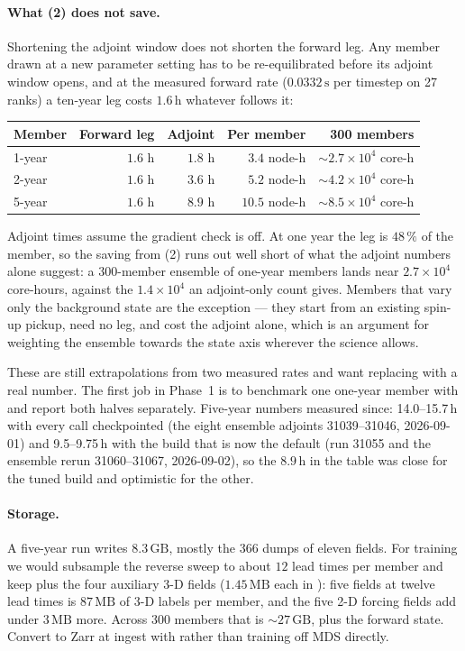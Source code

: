\paragraph{What (2) does not save.}
Shortening the adjoint window does not shorten the forward leg. Any member drawn
at a new parameter setting has to be re-equilibrated before its adjoint window
opens, and at the measured forward rate ($0.0332\,\mathrm{s}$ per timestep on 27
ranks) a ten-year leg costs $1.6\,\mathrm{h}$ whatever follows it:

\begin{center}
\begin{tabular}{lrrrr}
\toprule
\textbf{Member} & \textbf{Forward leg} & \textbf{Adjoint} &
\textbf{Per member} & \textbf{300 members}\\
\midrule
1-year & $1.6$ h & $1.8$ h & $3.4$ node-h  & $\sim\!2.7\times10^{4}$ core-h\\
2-year & $1.6$ h & $3.6$ h & $5.2$ node-h  & $\sim\!4.2\times10^{4}$ core-h\\
5-year & $1.6$ h & $8.9$ h & $10.5$ node-h & $\sim\!8.5\times10^{4}$ core-h\\
\bottomrule
\end{tabular}
\end{center}

Adjoint times assume the gradient check is off. At one year the leg is $48\,\%$
of the member, so the saving from (2) runs out well short of what the adjoint
numbers alone suggest: a 300-member ensemble of one-year members lands near
$2.7\times10^{4}$ core-hours, against the $1.4\times10^{4}$ an adjoint-only count
gives. Members that vary only the background state are the exception --- they
start from an existing spin-up pickup, need no leg, and cost the adjoint alone,
which is an argument for weighting the ensemble towards the state axis wherever
the science allows.

These are still extrapolations from two measured rates and want replacing with a
real number. The first job in Phase~1 is to benchmark one one-year member with
 and report both halves separately. Five-year
numbers measured since: 14.0--15.7\,h with every call checkpointed (the
eight ensemble adjoints 31039--31046, 2026-09-01) and 9.5--9.75\,h with the
 build that is now the default (run 31055 and the
ensemble rerun 31060--31067, 2026-09-02), so the $8.9$\,h in the table was
close for the tuned build and optimistic for the other.

\paragraph{Storage.}
A five-year run writes $8.3\,\mathrm{GB}$, mostly the $366$ dumps of eleven
fields. For training we would subsample the reverse sweep to about $12$ lead
times per member and keep  plus the four auxiliary 3-D fields
($1.45\,\mathrm{MB}$ each in ): five fields at twelve lead times
is $87\,\mathrm{MB}$ of 3-D labels per member, and the five 2-D forcing fields
add under $3\,\mathrm{MB}$ more. Across $300$ members that is
$\sim\!27\,\mathrm{GB}$, plus the forward state. Convert to Zarr at ingest with  rather than
training off MDS directly.

